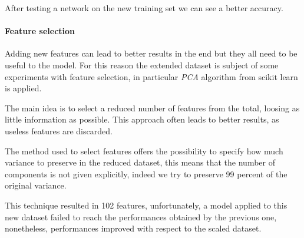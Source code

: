 After testing a network on the new training set 
we can see a better accuracy.

\paragraph{Feature selection}
Adding new features can lead to better results 
in the end but they all need to be useful to the model.
For this reason the extended dataset is subject of some experiments 
with feature selection, in particular \emph{PCA} algorithm from scikit
learn is applied.~\cite{pca}

The main idea is to select a reduced number of features from the total, 
loosing as little information as possible. This approach often leads to better results, 
as useless features are discarded.

The method used to select features offers the possibility to specify how much 
variance to preserve in the reduced dataset, this means that the number of 
components is not given explicitly, indeed we try to preserve 99 percent of the original variance.

This technique resulted in 102 features, unfortunately, a model applied to this new dataset 
failed to reach the performances obtained by the previous one, nonetheless, performances
improved with respect to the scaled dataset.
\newpage